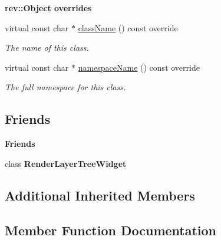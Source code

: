 \begin{Indent}\textbf{ rev\+::Object overrides}\par
\begin{DoxyCompactItemize}
\item 
virtual const char $\ast$ \mbox{\hyperlink{classrev_1_1_view_1_1_render_layer_item_ab7fbeef972e54db445d57f71e3ec1ef5}{class\+Name}} () const override
\begin{DoxyCompactList}\small\item\em The name of this class. \end{DoxyCompactList}\item 
virtual const char $\ast$ \mbox{\hyperlink{classrev_1_1_view_1_1_render_layer_item_a2b0a9658af4c9bcd14703e39d3917813}{namespace\+Name}} () const override
\begin{DoxyCompactList}\small\item\em The full namespace for this class. \end{DoxyCompactList}\end{DoxyCompactItemize}
\end{Indent}
\subsection*{Friends}
\begin{Indent}\textbf{ Friends}\par
\begin{DoxyCompactItemize}
\item 
\mbox{\label{classrev_1_1_view_1_1_render_layer_item_a20e6dd9b1e22ae1a635ff0f7eef9ef45}} 
class {\bfseries Render\+Layer\+Tree\+Widget}
\end{DoxyCompactItemize}
\end{Indent}
\subsection*{Additional Inherited Members}


\subsection{Member Function Documentation}
\mbox{\label{classrev_1_1_view_1_1_render_layer_item_ab7fbeef972e54db445d57f71e3ec1ef5}} 
